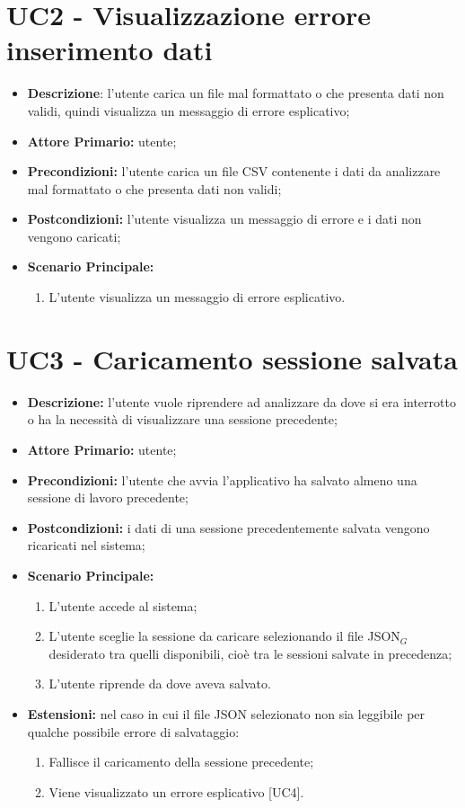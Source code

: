 \section{UC2 - Visualizzazione errore inserimento dati}
\begin{itemize}
  \item \textbf{Descrizione}: l'utente carica un file mal formattato o che presenta dati non validi, quindi visualizza un messaggio di errore esplicativo;
  \item \textbf{Attore Primario:} utente;
  \item \textbf{Precondizioni:} l’utente carica un file CSV contenente i dati da analizzare mal formattato o che presenta dati non validi;
  \item \textbf{Postcondizioni:} l'utente visualizza un messaggio di errore e i dati non vengono caricati;
  \item \textbf{Scenario Principale:}
  \begin{enumerate}
    \item L'utente visualizza un messaggio di errore esplicativo.
  \end{enumerate}
\end{itemize}

\section{UC3 - Caricamento sessione salvata}
\begin{itemize}
  \item \textbf{Descrizione:} l'utente vuole riprendere ad analizzare da dove si era interrotto o ha la necessità di visualizzare una sessione precedente;
  \item \textbf{Attore Primario:} utente;
  \item \textbf{Precondizioni:} l'utente che avvia l'applicativo ha salvato almeno una sessione di lavoro precedente;
  \item \textbf{Postcondizioni:} i dati di una sessione precedentemente salvata vengono ricaricati nel sistema;
  \item \textbf{Scenario Principale:}
  \begin{enumerate}
    \item L'utente accede al sistema;
    \item L'utente sceglie la sessione da caricare selezionando il file JSON$_G$ desiderato tra quelli disponibili,
    cioè tra le sessioni salvate in precedenza;
    \item L'utente riprende da dove aveva salvato.
  \end{enumerate}
  \item \textbf{Estensioni:} nel caso in cui il file JSON selezionato non sia leggibile per qualche possibile errore di salvataggio:
    \begin{enumerate}
      \item Fallisce il caricamento della sessione precedente;
      \item Viene visualizzato un errore esplicativo [UC4].
    \end{enumerate}
\end{itemize}

